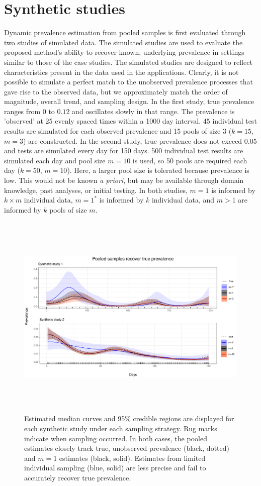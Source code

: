 \documentclass{article}
\begin{document}
\section{Synthetic studies}


Dynamic prevalence estimation from pooled samples is first evaluated through two studies of simulated data. The simulated studies are used to evaluate the proposed method's ability to recover known, underlying prevalence in settings similar to those of the case studies. The simulated studies are designed to reflect characteristics present in the data used in the applications. Clearly, it is not possible to simulate a perfect match to the unobserved prevalence processes that gave rise to the observed data, but we approximately match the order of magnitude, overall trend, and sampling design. In the first study, true prevalence ranges from $0$ to $0.12$ and oscillates slowly in that range. The prevalence is 'observed' at 25 evenly spaced times within a 1000 day interval. 45 individual test results are simulated for each observed prevalence and 15 pools of size 3 ($k=15$, $m=3$) are constructed. In the second study, true prevalence does not exceed 0.05 and tests are simulated every day for 150 days. 500 individual test results are simulated each day and pool size $m=10$ is used, so 50 pools are required each day ($k=50$, $m=10$). Here, a larger pool size is tolerated because prevalence is low. This would not be known\emph{ a priori}, but may be available through domain knowledge, past analyses, or initial testing. In both studies, $m=1$ is informed by $k\times m$ individual data, $m=1^*$ is informed by $k$ individual data, and $m>1$ are informed by $k$ pools of size $m$. 

\begin{figure}[ht!]
\centerline{\includegraphics[width=500pt,height=283pt]{Figure1.pdf}}
\caption{Estimated median curves and 95\% credible regions are displayed for each synthetic study under each sampling strategy. Rug marks indicate when sampling occurred. In both cases, the pooled estimates closely track true, unobserved prevalence (black, dotted) and $m=1$ estimates (black, solid). Estimates from limited individual sampling (blue, solid) are less precise and fail to accurately recover true prevalence. \label{fig1}}
\end{figure}
\end{document}
